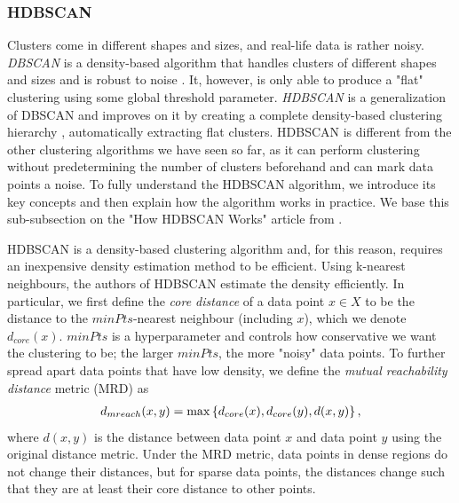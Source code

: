 \subsubsection{HDBSCAN}
\label{sec:hdbscan-clustering}
Clusters come in different shapes and sizes, and real-life data is rather noisy. \textit{DBSCAN} is a density-based algorithm that handles clusters of different shapes and sizes and is robust to noise \cite{Ester1996}. It, however, is only able to produce a "flat" clustering using some global threshold parameter. \textit{HDBSCAN} is a generalization of DBSCAN and improves on it by creating a complete density-based clustering hierarchy \cite{Campello2013}, automatically extracting flat clusters. HDBSCAN is different from the other clustering algorithms we have seen so far, as it can perform clustering without predetermining the number of clusters beforehand and can mark data points a noise. To fully understand the HDBSCAN algorithm, we introduce its key concepts and then explain how the algorithm works in practice. We base this sub-subsection on the "How HDBSCAN Works" article from \cite{how-hdbscan-works-2016}.

HDBSCAN is a density-based clustering algorithm and, for this reason, requires an inexpensive density estimation method to be efficient. Using k-nearest neighbours, the authors of HDBSCAN estimate the density efficiently. In particular, we first define the \textit{core distance} of a data point $x \in X$ to be the distance to the $\textit{minPts}$-nearest neighbour (including $x$), which we denote $d_{core}(x)$. $\textit{minPts}$ is a hyperparameter and controls how conservative we want the clustering to be; the larger $\textit{minPts}$, the more "noisy" data points. To further spread apart data points that have low density, we define the \textit{mutual reachability distance} metric (MRD) as
\begin{align}
    d_{mreach}(x, y) = \max \left\{ d_{core}(x), d_{core}(y), d(x, y) \right\},
    \label{eqn:mutual_reachability_distance}
\end{align}
where $d(x, y)$ is the distance between data point $x$ and data point $y$ using the original distance metric. Under the MRD metric, data points in dense regions do not change their distances, but for sparse data points, the distances change such that they are at least their core distance to other points.

